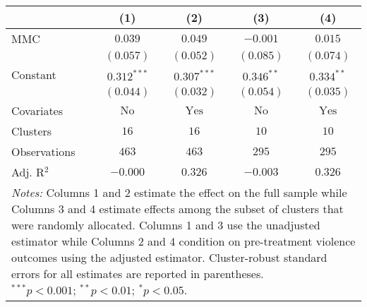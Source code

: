 
\begin{tabular}{l c c c c}
\toprule
 & (1) & (2) & (3) & (4) \\
\midrule
MMC          & $0.039$       & $0.049$        & $-0.001$      & $0.015$        \\
             & $(0.057)$     & $(0.052)$      & $(0.085)$     & $(0.074)$      \\
Constant     & $0.312^{***}$ & $0.307^{***}$  & $0.346^{**}$  & $0.334^{**}$   \\
             & $(0.044)$     & $(0.032)$      & $(0.054)$     & $(0.035)$      \\
\midrule
Covariates   & $\textrm{No}$ & $\textrm{Yes}$ & $\textrm{No}$ & $\textrm{Yes}$ \\
Clusters     & $16$          & $16$           & $10$          & $10$           \\
Observations & $463$         & $463$          & $295$         & $295$          \\
Adj. R$^2$   & $-0.000$      & $0.326$        & $-0.003$      & $0.326$        \\
\bottomrule
\multicolumn{5}{l}{\scriptsize{\parbox{.5\linewidth}{\vspace{2pt} 
       \textit{Notes:} Columns 1 and 2 estimate the effect on the full sample while Columns 3 
       and 4 estimate effects among the subset of clusters that were randomly allocated.
       Columns 1 and 3 use the unadjusted estimator while Columns 2 and 4 condition on 
       pre-treatment violence outcomes using the adjusted estimator. Cluster-robust 
       standard errors for all estimates are reported in parentheses. \\ $^{***}p<0.001$; $^{**}p<0.01$; $^{*}p<0.05$.}}}
\end{tabular}
